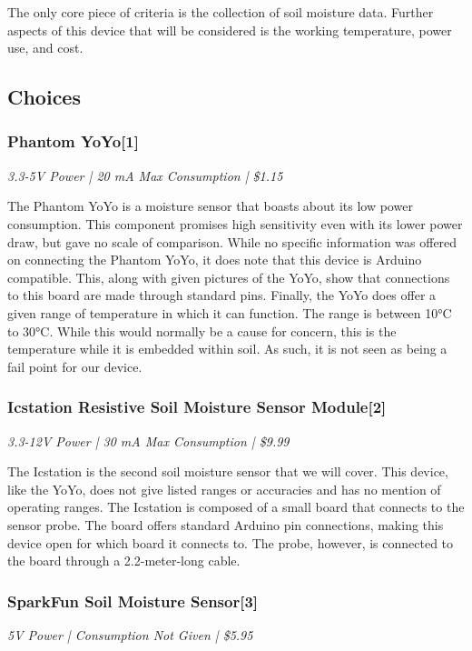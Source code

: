 \documentclass[IEEEtran,letterpaper,10pt,titlepage,fleqn,draftclsnofoot,onecolumn]{article}
\begin{document}
The only core piece of criteria is the collection of soil moisture data. Further aspects of this device that will be considered is the working temperature, power use, and cost. 

\subsection{Choices}
\subsubsection{Phantom YoYo[1]}
\textit{3.3-5V Power | 20 mA Max Consumption | \$1.15}

\vspace{1mm}

The Phantom YoYo is a moisture sensor that boasts about its low power consumption. This component promises high sensitivity even with its lower power draw, but gave no scale of comparison. While no specific information was offered on connecting the Phantom YoYo, it does note that this device is Arduino compatible. This, along with given pictures of the YoYo, show that connections to this board are made through standard pins. Finally, the YoYo does offer a given range of temperature in which it can function. The range is between 10°C to 30°C. While this would normally be a cause for concern, this is the temperature while it is embedded within soil. As such, it is not seen as being a fail point for our device.

\subsubsection{Icstation Resistive Soil Moisture Sensor Module[2]}
\textit{3.3-12V Power | 30 mA Max Consumption | \$9.99}

\vspace{1mm}

The Icstation is the second soil moisture sensor that we will cover. This device, like the YoYo, does not give listed ranges or accuracies and has no mention of operating ranges. The Icstation is composed of a small board that connects to the sensor probe. The board offers standard Arduino pin connections, making this device open for which board it connects to. The probe, however, is connected to the board through a 2.2-meter-long cable. 

\subsubsection{SparkFun Soil Moisture Sensor[3]}
\textit{5V Power | Consumption Not Given | \$5.95}
\end{document}
